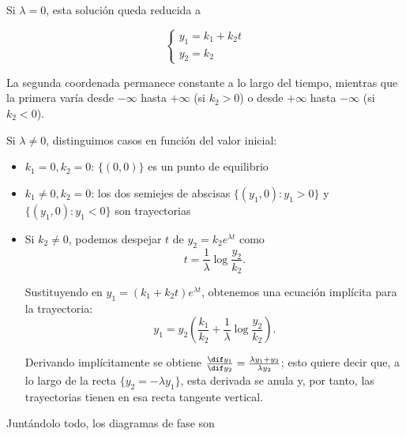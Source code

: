 \documentclass[../ecuaciones_diferenciales.tex]{subfiles}
\begin{document}
Si \(\lambda = 0\), esta solución queda reducida a

\[
	\begin{cases}
		y_1 = k_1 + k_2 t \\
		y_2 = k_2
	\end{cases}
\]

La segunda coordenada permanece constante a lo largo del tiempo, mientras que la
primera varía desde \(-\infty\) hasta \(+\infty\) (si \(k_2 > 0\)) o desde
\(+\infty\) hasta \(-\infty\) (si \(k_2 < 0\)).

Si \(\lambda \neq 0\), distinguimos casos en función del valor inicial:

\begin{itemize}
	\item \(k_1 = 0, k_2 = 0\): \(\{(0,0)\}\) es un punto de equilibrio
	\item \(k_1 \neq 0, k_2 = 0\): los dos semiejes de abscisas
	      \(\{(y_1, 0) : y_1 > 0\}\) y \(\{(y_1,0) : y_1 < 0\}\) son trayectorias
	\item Si \(k_2 \neq 0\), podemos despejar \(t\) de \(y_2 = k_2e^{\lambda t}\) como
	      \[t = \frac{1}{\lambda} \log \frac{y_2}{k_2}.\]

	      Sustituyendo en \(y_1 = (k_1 + k_2t)e^{\lambda t}\), obtenemos una ecuación
	      implícita para la trayectoria:
	      \[y_1 = y_2 \left( \frac{k_1}{k_2} + \frac{1}{\lambda} \log \frac{y_2}{k_2}
		      \right).\]

	      Derivando implícitamente se obtiene
	      \(\frac{\dif y_1}{\dif y_2} = \frac{\lambda y_1 + y_2}{\lambda y_2}\); esto
	      quiere decir que, a lo largo de la recta \(\{y_2 = -\lambda y_1\}\), esta
	      derivada se anula y, por tanto, las trayectorias tienen en esa recta tangente
	      vertical.
\end{itemize}

Juntándolo todo, los diagramas de fase son
\end{document}
